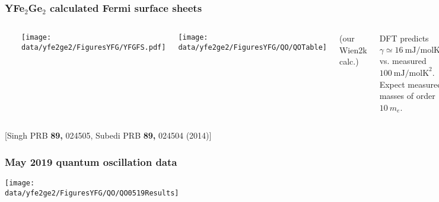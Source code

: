 \begin{frame}[label=YFGFermiSurface]
\frametitle{YFe$_2$Ge$_2$ calculated Fermi surface sheets}

\begin{columns}[T]
\centerline{~}
\centerline{\texttt{[image: \\data/yfe2ge2/FiguresYFG/YFGFS.pdf]}}

\centerline{\texttt{[image: \\data/yfe2ge2/FiguresYFG/QO/QOTable]}}
\centerline{(our Wien2k calc.)}
\vspace{0.5em}

{\small DFT predicts $\gamma \simeq 16 ~\text{mJ/molK}^2$ vs. measured
$100~\text{mJ/molK}^2$. \\
\vspace{1.5em}
Expect measured masses of order $10~m_e$.
}








\end{columns}



\vspace*{\fill}
\centerline{\makebox[\linewidth]{\rule{0.85\textwidth}{0.4pt}}}
\centerline{\scriptsize[Singh PRB {\bf 89,} 024505, Subedi PRB {\bf
    89,} 024504 (2014)]}
\end{frame}



\begin{frame}[label=YFGQO0519]
\frametitle{May 2019 quantum oscillation data}

\centerline{\texttt{[image: \\data/yfe2ge2/FiguresYFG/QO/QO0519Results]}}
\end{frame}


